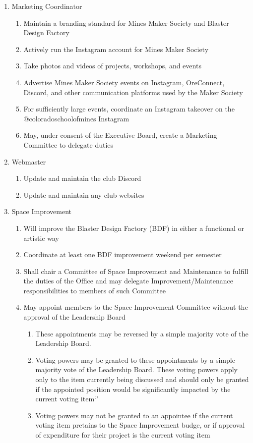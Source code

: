 \documentclass[12pt,letterpaper]{article}
\begin{document}
\begin{enumerate}
    \item Marketing Coordinator 
    \begin{enumerate}
        \item Maintain a branding standard for Mines Maker Society and Blaster Design Factory
        \item Actively run the Instagram account for Mines Maker Society
        \item Take photos and videos of projects, workshops, and events
        \item Advertise Mines Maker Society events on Instagram, OreConnect, Discord, and other communication platforms used by the Maker Society
        \item For sufficiently large events, coordinate an Instagram takeover on the @coloradoschoolofmines Instagram
        \item May, under consent of the Executive Board, create a Marketing Committee to delegate duties
    \end{enumerate}

    \item Webmaster 
    \begin{enumerate}
        \item Update and maintain the club Discord
        \item Update and maintain any club websites
    \end{enumerate}

    \item Space Improvement 
    \begin{enumerate}
        \item Will improve the Blaster Design Factory (BDF) in either a functional or artistic way
        \item Coordinate at least one BDF improvement weekend per semester
        \item Shall chair a Committee of Space Improvement and Maintenance to fulfill the duties of the Office and may delegate Improvement/Maintenance responsibilities to members of such Committee
        \item May appoint members to the Space Improvement Committee without the approval of the Leadership Board
        \begin{enumerate}
            \item These appointments may be reversed by a simple majority vote of the Leadership Board.
            \item Voting powers may be granted to these appointments by a simple majority vote of the Leadership Board.
            These voting powers apply only to the item currently being discussed and should only be granted if the appointed position would be significantly impacted by the current voting item`'
            \item Voting powers may not be granted to an appointee if the current voting item pretains to the Space Improvement budge, or if approval of expenditure for their project is the current voting item
        \end{enumerate}
    \end{enumerate}


\end{enumerate}
\end{document}

